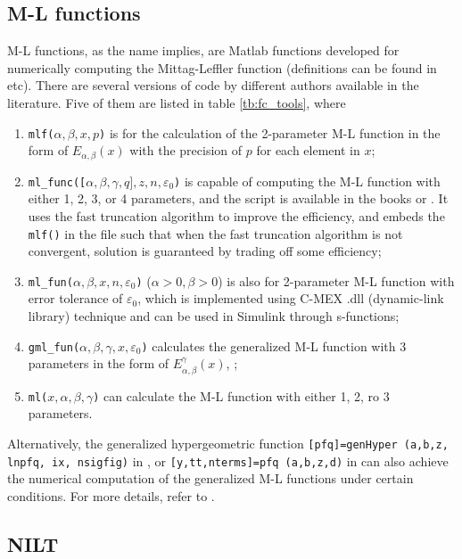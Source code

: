 \documentclass[11pt]{tCON2e}
\theoremstyle{plain}\newtheorem{theorem}{Theorem}
\theoremstyle{definition}
\theoremstyle{remark}
\begin{document}
\subsection{M-L functions}
M-L functions, as the name implies, are Matlab functions developed for numerically computing the Mittag-Leffler function (definitions can be found in \cite{ref:Magin} etc). There are several versions of code by different authors available in the literature. Five of them are listed in table \ref{tb:fc_tools}, where
\begin{enumerate}
    \item {\tt mlf($\alpha, \beta, x, p$)} is for the calculation of the 2-parameter M-L function in the form of $E_{\alpha,\beta}(x)$ with the precision of $p$ for each element in $x$;
    \item {\tt ml\_func([$\alpha, \beta, \gamma, q], z, n, \varepsilon_0$)} is capable of computing the M-L function with either 1, 2, 3, or 4 parameters, and the script is available in the books \cite{ref:Xuedingyu} or \cite{ref:Monje}. It uses the fast truncation algorithm to improve the efficiency, and embeds the {\tt mlf()} in the file such that when the fast truncation algorithm is not convergent, solution is guaranteed by trading off some efficiency;
    \item {\tt ml\_fun($\alpha, \beta, x, n, \varepsilon_0$)} ($\alpha>0, \beta>0$) is also for 2-parameter M-L function with error tolerance of $\varepsilon_0$, which is implemented using C-MEX .dll (dynamic-link library) technique and can be used in Simulink through s-functions;
    \item {\tt gml\_fun($\alpha, \beta, \gamma, x, \varepsilon_0$)} calculates the generalized M-L function with 3 parameters in the form of $E_{\alpha,\beta}^{\gamma}(x)$, \cite{ref:generalized_ML};
    \item {\tt ml($x, \alpha, \beta, \gamma$)} can calculate the M-L function with either 1, 2, ro 3 parameters.
\end{enumerate}

Alternatively, the generalized hypergeometric function {\tt [pfq]=genHyper (a,b,z, lnpfq, ix, nsigfig)} in \cite{ref:genHyper}, or {\tt [y,tt,nterms]=pfq (a,b,z,d)} in \cite{ref:pFq} can also achieve the numerical computation of the generalized M-L functions under certain conditions. For more details, refer to \cite{ref:generalized_ML_Chaurasia}.




\subsection{NILT}
\end{document}
